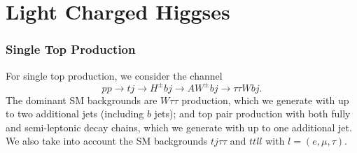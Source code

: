 \chapter{Light Charged Higgses}\label{ch:LightChargedHiggs}
\newcommand{\sba}{\ensuremath{\sin(\beta-\alpha)}}
\newcommand{\cba}{\ensuremath{\cos(\beta-\alpha)}}
\newcommand{\hc}{H^{\pm}}
\newcommand{\w}{W^{\pm}}
\newcommand{\Barath}[1]{{\bf\color{cyan} BC: #1}}
\newcommand{\Felix}[1]{{\bf\color{blue} FK: #1}}
\newcommand{\Shufang}[1]{{\bf\color{red} SS: #1}}
\newcommand{\Note}[1]{{\bf\color{red} #1}}
\newcommand{\met}{\ensuremath{{\not\mathrel{E}}_T}}
\newcommand{\ifb}{\ensuremath{ \text{fb}^{-1}  }}
\newcommand{\cmark}{\ding{51}}%
\newcommand{\xmark}{\ding{55}}%


\subsection{Single Top Production}
 \label{sec:analysis_tj}
 
For single top production, we consider the channel\
\begin{equation}
pp\rightarrow tj\rightarrow \hc bj\rightarrow AW^{\pm}bj \rightarrow \tau\tau W bj.
\end{equation}    The dominant SM backgrounds are $W\tau\tau$ production, which we generate with up to two additional jets (including $b$ jets); and  top pair production with both fully and semi-leptonic decay chains, which we generate with up to one additional jet. We also take into account the SM backgrounds $tj\tau\tau$ and $ttll$ with $l= (e, \mu, \tau)$.

